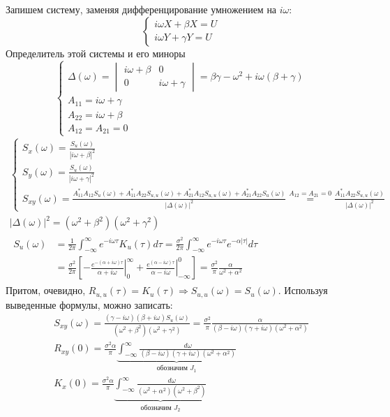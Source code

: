 \documentclass[a4paper,14pt]{extarticle}
\begin{document}
Запишем систему, заменяя дифференцирование умножением на $i\omega$:
\[ \begin{cases}
    i\omega X + \beta X = U \\
    i\omega Y + \gamma Y = U
\end{cases} \]
Определитель этой системы и его миноры
\[\begin{cases}
    \Delta(\omega) = \begin{vmatrix}
        i\omega + \beta & 0 \\
        0 & i\omega + \gamma
    \end{vmatrix} = \beta \gamma - \omega^2 + i\omega(\beta + \gamma) \\
    A_{11} = i\omega + \gamma \\
    A_{22} = i\omega + \beta \\
    A_{12} = A_{21} = 0
\end{cases}\]
\begin{gather*}
    \begin{cases}
        S_x(\omega) = \frac{S_u(\omega)}{|i\omega+\beta|^2} \\
        S_y(\omega) = \frac{S_u(\omega)}{|i\omega+\gamma|^2} \\
        S_{xy}(\omega) = \frac{A_{11}^* A_{12} S_{u}(\omega) + A_{11}^* A_{22} S_{u,u}(\omega) + A_{21}^* A_{12} S_{u,u}(\omega) + A_{21}^* A_{22} S_{u}(\omega)}{|\Delta(\omega)|^2} \overset{A_{12}=A_{21}=0}= \frac{A_{11}^* A_{22} S_{u,u}(\omega)}{|\Delta(\omega)|^2}
    \end{cases} \\
    |\Delta(\omega)|^2 = (\omega^2 + \beta^2)(\omega^2 + \gamma^2) \\
    \begin{aligned}
        S_u(\omega) &= \frac{1}{2\pi} \int_{-\infty}^\infty e^{-i\omega \tau} K_u(\tau) d\tau = \frac{\sigma^2}{2\pi} \int_{-\infty}^\infty e^{-i\omega\tau} e^{-\alpha|\tau|} d\tau \\
        &= \frac{\sigma^2}{2\pi} \left[ -\left.\frac{e^{-(\alpha+i\omega)\tau}}{\alpha+i\omega}\right|_0^\infty + \left.\frac{e^{(\alpha-i\omega)\tau}}{\alpha-i\omega}\right|_{-\infty}^0 \right] = \frac{\sigma^2}{\pi} \frac{\alpha}{\omega^2 + \alpha^2}
    \end{aligned}
\end{gather*}
Притом, очевидно, $R_{u,u}(\tau) = K_u(\tau) \Rightarrow S_{u,u}(\omega) = S_u(\omega)$.
Используя выведенные формулы, можно записать:
\begin{gather*}
    S_{xy}(\omega) = \frac{(\gamma-i\omega)(\beta+i\omega)S_{u}(\omega)}{(\omega^2+\beta^2)(\omega^2+\gamma^2)} = \frac{\sigma^2}{\pi} \frac{\alpha}{(\beta-i\omega)(\gamma+i\omega)(\omega^2+\alpha^2)} \\
    R_{xy}(0) = \frac{\sigma^2\alpha}{\pi} \underbrace{ \int_{-\infty}^\infty \frac{d\omega}{(\beta-i\omega)(\gamma+i\omega)(\omega^2+\alpha^2)}}_{\text{обозначим } J_1} \\
    K_x(0) = \frac{\sigma^2\alpha}{\pi} \underbrace{ \int_{-\infty}^\infty \frac{d\omega}{(\omega^2+\alpha^2)(\omega^2+\beta^2)}}_{\text{обозначим } J_2}
\end{gather*}
\end{document}
